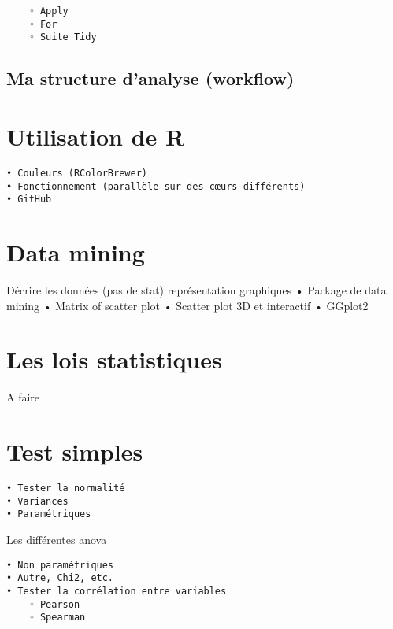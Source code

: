 \documentclass[
]{book}
\begin{document}
\begin{verbatim}
    ◦ Apply
    ◦ For
    ◦ Suite Tidy
\end{verbatim}

\hypertarget{ma-structure-danalyse-workflow}{%
\section{Ma structure d'analyse (workflow)}\label{ma-structure-danalyse-workflow}}

\hypertarget{utilisation-de-r}{%
\chapter{Utilisation de R}\label{utilisation-de-r}}

\begin{verbatim}
• Couleurs (RColorBrewer)
• Fonctionnement (parallèle sur des cœurs différents)
• GitHub
\end{verbatim}

\hypertarget{data-mining}{%
\chapter{Data mining}\label{data-mining}}

Décrire les données (pas de stat) représentation graphiques
• Package de data mining
• Matrix of scatter plot
• Scatter plot 3D et interactif
• GGplot2

\hypertarget{les-lois-statistiques}{%
\chapter{Les lois statistiques}\label{les-lois-statistiques}}

A faire

\hypertarget{test-simples}{%
\chapter{Test simples}\label{test-simples}}

\begin{verbatim}
• Tester la normalité
• Variances
• Paramétriques
\end{verbatim}

Les différentes anova

\begin{verbatim}
• Non paramétriques
• Autre, Chi2, etc. 
• Tester la corrélation entre variables
    ◦ Pearson
    ◦ Spearman
\end{verbatim}
\end{document}
